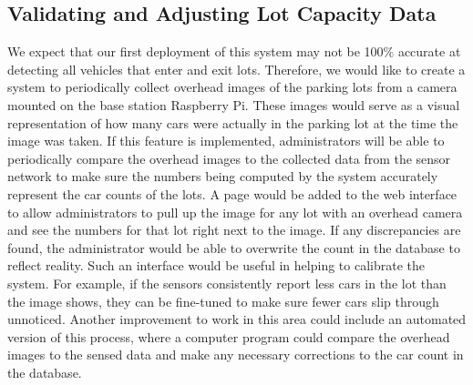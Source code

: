 \documentclass[11pt, oneside, fullpage, doublespace]{article}
\begin{document}
\subsection{Validating and Adjusting Lot Capacity Data}
We expect that our first deployment of this system may not be 100\% accurate at detecting all vehicles that enter and exit lots. Therefore, we would like to create a system to periodically collect overhead images of the parking lots from a camera mounted on the base station Raspberry Pi. These images would serve as a visual representation of how many cars were actually in the parking lot at the time the image was taken. If this feature is implemented, administrators will be able to periodically compare the overhead images to the collected data from the sensor network to make sure the numbers being computed by the system accurately represent the car counts of the lots. A page would be added to the web interface to allow administrators to pull up the image for any lot with an overhead camera and see the numbers for that lot right next to the image. If any discrepancies are found, the administrator would be able to overwrite the count in the database to reflect reality. Such an interface would be useful in helping to calibrate the system. For example, if the sensors consistently report less cars in the lot than the image shows, they can be fine-tuned to make sure fewer cars slip through unnoticed. Another improvement to work in this area could include an automated version of this process, where a computer program could compare the overhead images to the sensed data and make any necessary corrections to the car count in the database.
\end{document}
